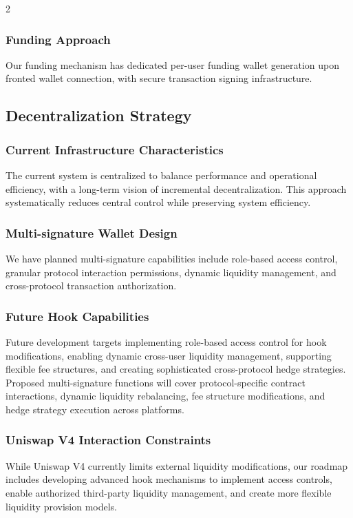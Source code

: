 \documentclass[10pt]{article}
\begin{document}
\begin{multicols}{2}
\subsubsection{Funding Approach}
Our funding mechanism has dedicated per-user funding wallet generation upon fronted wallet connection, with secure transaction signing infrastructure.

\subsection{Decentralization Strategy}
\subsubsection{Current Infrastructure Characteristics}
The current system is centralized to balance performance and operational efficiency, with a long-term vision of incremental decentralization. This approach systematically reduces central control while preserving system efficiency.

\subsubsection{Multi-signature  Wallet Design}
We have planned multi-signature capabilities include role-based access control, granular protocol interaction permissions, dynamic liquidity management, and cross-protocol transaction authorization.

\subsubsection{Future Hook Capabilities}
Future development targets implementing role-based access control for hook modifications, enabling dynamic cross-user liquidity management, supporting flexible fee structures, and creating sophisticated cross-protocol hedge strategies. Proposed multi-signature functions will cover protocol-specific contract interactions, dynamic liquidity rebalancing, fee structure modifications, and hedge strategy execution across platforms.

\subsubsection{Uniswap V4 Interaction Constraints}
While Uniswap V4 currently limits external liquidity modifications, our roadmap includes developing advanced hook mechanisms to implement access controls, enable authorized third-party liquidity management, and create more flexible liquidity provision models.


\end{multicols}
\end{document}
